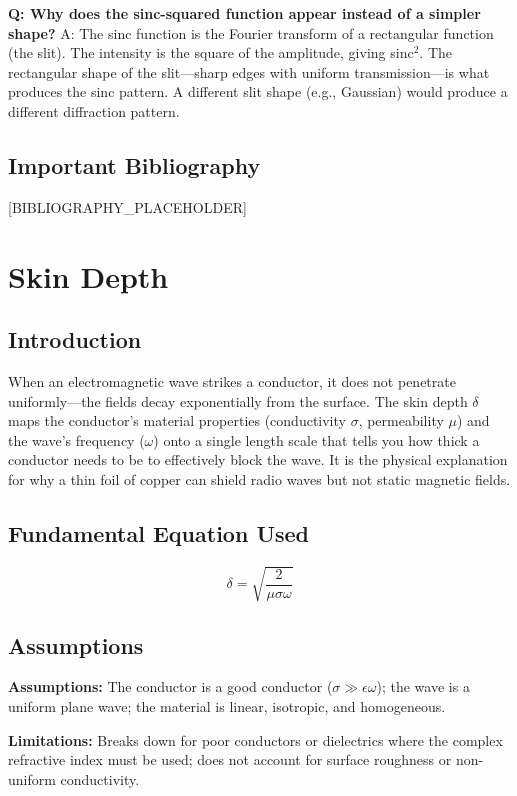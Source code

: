 \documentclass[11pt,openright]{book}
\begin{document}
\textbf{Q: Why does the sinc-squared function appear instead of a simpler shape?}
A: The sinc function is the Fourier transform of a rectangular function (the slit). The intensity is the square of the amplitude, giving sinc$^2$. The rectangular shape of the slit---sharp edges with uniform transmission---is what produces the sinc pattern. A different slit shape (e.g., Gaussian) would produce a different diffraction pattern.
\section*{Important Bibliography}

[BIBLIOGRAPHY_PLACEHOLDER]


\chapter{Skin Depth}

\section*{Introduction}

When an electromagnetic wave strikes a conductor, it does not penetrate uniformly---the fields decay exponentially from the surface. The skin depth $\delta$ maps the conductor's material properties (conductivity $\sigma$, permeability $\mu$) and the wave's frequency ($\omega$) onto a single length scale that tells you how thick a conductor needs to be to effectively block the wave. It is the physical explanation for why a thin foil of copper can shield radio waves but not static magnetic fields.
\section*{Fundamental Equation Used}

\begin{equation}
\delta = \sqrt{\frac{2}{\mu\sigma\omega}}
\end{equation}
\section*{Assumptions}

\textbf{Assumptions:} The conductor is a good conductor ($\sigma \gg \epsilon\omega$); the wave is a uniform plane wave; the material is linear, isotropic, and homogeneous.


\textbf{Limitations:} Breaks down for poor conductors or dielectrics where the complex refractive index must be used; does not account for surface roughness or non-uniform conductivity.
\end{document}
